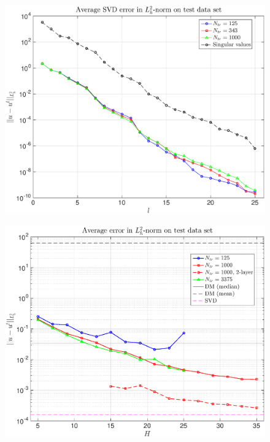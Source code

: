 \documentclass[11pt,a4paper]{article}
\theoremstyle{definition}
\theoremstyle{theorem}
\numberwithin{equation}{section}
\begin{document}
	\begin{figure}[H]
		\center
		\includegraphics[scale = 0.5]{fig17}
		\caption{}
	\end{figure}
	
	\begin{figure}[H]
		\center
		\includegraphics[scale = 0.5]{fig18}
		\caption{}
	\end{figure}
	
\end{document}
